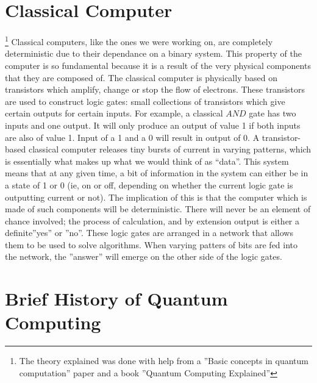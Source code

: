 \documentclass[12pt]{report}
\begin{document}
\section{Classical Computer}
\footnote{The theory explained was done with help from a ''Basic concepts in quantum computation'' paper\cite{2} and a book ''Quantum Computing Explained''\cite{3}
}
Classical computers, like the ones we were working on, are completely deterministic due to their dependance on a binary system. This property of the computer is so fundamental because it is a result of the very physical components that they are composed of.
The classical computer is physically based on transistors which amplify, change or stop the flow of electrons. These transistors are used to construct logic gates: small collections of transistors which give certain outputs for certain inputs.
For example, a classical $AND$ gate has two inputs and one output. It will only produce an output of value 1 if both inputs are also of value 1. Input of a 1 and a 0 will result in output of 0.
A transistor-based classical computer releases tiny bursts of current in varying patterns, which is essentially what makes up what we would think of as “data”.  This system means that at any given time, a bit of information in the system can either be in a state of 1 or 0 (ie, on or off, depending on whether the current logic gate is outputting current or not). The implication of this is that the computer which is made of such components will be deterministic. There will never be an element of chance involved; the process of calculation, and by extension output is either a definite''yes'' or ''no''. These logic gates are arranged in a network that allows them to be used to solve algorithms. When varying patters of bits are fed into the network, the ''answer'' will emerge on the other side of the logic gates.

\section{Brief History of Quantum Computing}
\end{document}
